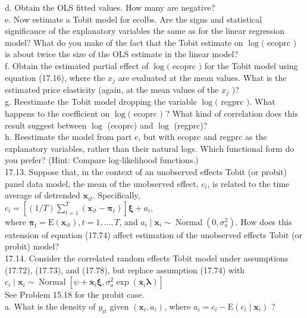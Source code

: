 \documentclass[10pt]{article}
\begin{document}
d. Obtain the OLS fitted values. How many are negative?\\
e. Now estimate a Tobit model for ecolbs. Are the signs and statistical significance of the explanatory variables the same as for the linear regression model? What do you make of the fact that the Tobit estimate on $\log ($ ecoprc $)$ is about twice the size of the OLS estimate in the linear model?\\
f. Obtain the estimated partial effect of $\log ($ ecoprc $)$ for the Tobit model using equation (17.16), where the $x_{j}$ are evaluated at the mean values. What is the estimated price elasticity (again, at the mean values of the $x_{j}$ )?\\
g. Reestimate the Tobit model dropping the variable $\log ($ regprc $)$. What happens to the coefficient on $\log ($ ecoprc $)$ ? What kind of correlation does this result suggest between $\log$ (ecoprc) and $\log$ (regprc)?\\
h. Reestimate the model from part e, but with ecoprc and regprc as the explanatory variables, rather than their natural logs. Which functional form do you prefer? (Hint: Compare log-likelihood functions.)\\
17.13. Suppose that, in the context of an unobserved effects Tobit (or probit) panel data model, the mean of the unobserved effect, $c_{i}$, is related to the time average of detrended $\mathbf{x}_{i t}$. Specifically,\\
$c_{i}=\left[(1 / T) \sum_{t=1}^{T}\left(\mathbf{x}_{i t}-\boldsymbol{\pi}_{t}\right)\right] \boldsymbol{\xi}+a_{i}$,\\
where $\boldsymbol{\pi}_{t}=\mathrm{E}\left(\mathbf{x}_{i t}\right), t=1, \ldots, T$, and $a_{i} \mid \mathbf{x}_{i} \sim \operatorname{Normal}\left(0, \sigma_{a}^{2}\right)$. How does this extension of equation (17.74) affect estimation of the unobserved effects Tobit (or probit) model?\\
17.14. Consider the correlated random effects Tobit model under assumptions (17.72), (17.73), and (17.78), but replace assumption (17.74) with\\
$c_{i} \mid \mathbf{x}_{i} \sim \operatorname{Normal}\left[\psi+\overline{\mathbf{x}}_{i} \boldsymbol{\xi}, \sigma_{a}^{2} \exp \left(\overline{\mathbf{x}}_{i} \boldsymbol{\lambda}\right)\right]$\\
See Problem 15.18 for the probit case.\\
a. What is the density of $y_{i t}$ given $\left(\mathbf{x}_{i}, a_{i}\right)$, where $a_{i}=c_{i}-\mathrm{E}\left(c_{i} \mid \mathbf{x}_{i}\right)$ ?\\
\end{document}
